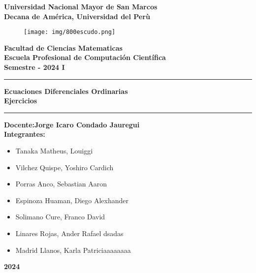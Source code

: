 \backgroundsetup{
        placement = center,
        angle = 0,
        scale = 1,
        opacity = 0.8,
}

\begin{titlepage}
\begin{center}
{ \LARGE\textbf{Universidad Nacional Mayor de San Marcos}}\\
 \vspace{3.5mm}
{\large \textbf{Decana de América, Universidad del Perù}}\\
  \vspace{3.5mm}
  \begin{figure}[h]
      \centering
      \texttt{[image: img/800escudo.png]}
  \end{figure}
{ \Large\textbf{Facultad de Ciencias Matematicas}}\\
 \vspace{3.5mm}
{ \large\textbf{Escuela Profesional de Computación Científica}}\\
 \vspace{3.5mm}
{ \large\textbf{Semestre - 2024 I}}\\
{\rule{\linewidth}{0.55mm}} 
 { \Large\textbf{Ecuaciones Diferenciales Ordinarias\\ Ejercicios}}\\
{\rule{\linewidth}{0.55mm}} 
{ \large\textbf{Docente:Jorge Icaro Condado Jauregui}}\\ \vspace{3.5mm}
{ \large\textbf{Integrantes: }}\\
 \vspace{3.5mm}
\begin{itemize}
    \item Tanaka Matheus, Louiggi 
    \item Vilchez Quispe, Yoshiro Cardich 
    \item Porras Anco, Sebastian Aaron 
    \item Espinoza Huaman, Diego Alexhander 
    \item Solimano Cure, Franco David 
    \item Linares Rojas, Ander Rafael dsadas
    \item Madrid Llanos, Karla Patriciaaaaaaaa
\end{itemize}
\vfill
{ \huge\textbf{2024}}
\end{center}
\end{titlepage}

